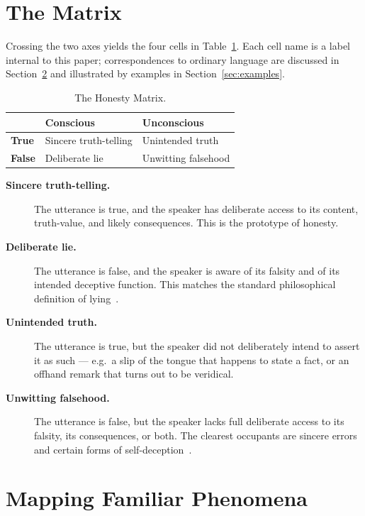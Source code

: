 \documentclass[11pt,a4paper]{article}
\begin{document}
\section{The Matrix}

Crossing the two axes yields the four cells in Table~\ref{tab:matrix}.
Each cell name is a label internal to this paper; correspondences to
ordinary language are discussed in Section~\ref{sec:phenomena} and
illustrated by examples in Section~\ref{sec:examples}.

\begin{table}[h]
\centering
\caption{The Honesty Matrix.}
\label{tab:matrix}
\begin{tabular}{lll}
\toprule
            & \textbf{Conscious}            & \textbf{Unconscious} \\
\midrule
\textbf{True}  & Sincere truth-telling      & Unintended truth \\
\textbf{False} & Deliberate lie             & Unwitting falsehood \\
\bottomrule
\end{tabular}
\end{table}

\begin{description}
  \item[\textbf{Sincere truth-telling.}] The utterance is true, and the
        speaker has deliberate access to its content, truth-value, and
        likely consequences. This is the prototype of honesty.
  \item[\textbf{Deliberate lie.}] The utterance is false, and the
        speaker is aware of its falsity and of its intended deceptive
        function. This matches the standard philosophical definition of
        lying~\cite{mahon2016sep,carson2010}.
  \item[\textbf{Unintended truth.}] The utterance is true, but the
        speaker did not deliberately intend to assert it as such ---
        e.g.\ a slip of the tongue that happens to state a fact, or an
        offhand remark that turns out to be veridical.
  \item[\textbf{Unwitting falsehood.}] The utterance is false, but the
        speaker lacks full deliberate access to its falsity, its
        consequences, or both. The clearest occupants are sincere
        errors and certain forms of self-deception~\cite{mele2001}.
\end{description}

\section{Mapping Familiar Phenomena}
\label{sec:phenomena}
\end{document}
